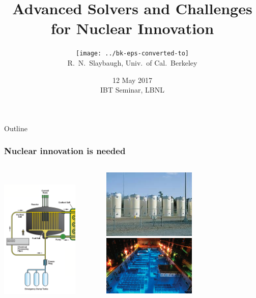 \documentclass[xcolor=x11names,compress]{beamer}
\title{Advanced Solvers and Challenges for Nuclear Innovation}
\author{\texttt{[image: ../bk-eps-converted-to]}\\R.\ N.\ Slaybaugh, Univ.\ of Cal.\ Berkeley
}
\date{12 May 2017 \\ IBT Seminar, LBNL}
\renewcommand{\(}{\begin{columns}}
\renewcommand{\)}{\end{columns}}
\newcommand{\<}[1]{\begin{column}{#1}}
\renewcommand{\>}{\end{column}}
\begin{document}
\begin{frame}
\titlepage
\end{frame}

\begin{frame}[fragile]{Outline}
  \frametitle{Nuclear innovation is needed}

\begin{columns}
  \begin{column}{0.5\textwidth}
  		\includegraphics[height=2.75in,clip]{../figs/msr-core-diagram}
  \end{column}
  \begin{column}{0.5\textwidth}
        \renewcommand*{\thesubfigure}{}
      \begin{figure}[htp]
        \centering
        \includegraphics[width=1.75in]{../figs/isfsi}

        \includegraphics[width=1.75in]{../figs/spent-fuel-pool}
      \end{figure}    
  \end{column}
\end{columns}

\end{frame}
\end{document}
